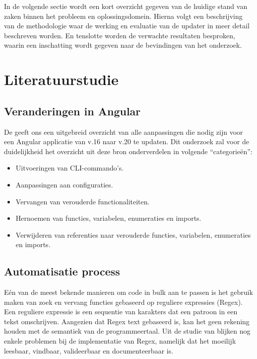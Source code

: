 In de volgende sectie wordt een kort overzicht gegeven van de huidige stand van zaken binnen het probleem en oplossingsdomein.
Hierna volgt een beschrijving van de methodologie waar de werking en evaluatie van de updater in meer detail beschreven worden.
En tenslotte worden de verwachte resultaten besproken, waarin een inschatting wordt gegeven naar de bevindingen van het onderzoek.

\section{Literatuurstudie}
\label{sec:literatuurstudie}

\subsection{Veranderingen in Angular}

De \textcite{AngularUpdateGuide} geeft ons een uitgebreid overzicht van alle aanpassingen die nodig zijn voor een Angular applicatie van v.16 naar v.20 te updaten. 
Dit onderzoek zal voor de duidelijkheid het overzicht uit deze bron onderverdelen in volgende ``categorieën'':

\begin{itemize}
  \item Uitvoeringen van CLI-commando's.
  \item Aanpassingen aan configuraties.
  \item Vervangen van verouderde functionaliteiten.
  \item Hernoemen van functies, variabelen, enumeraties en imports.
  \item Verwijderen van referenties naar verouderde functies, variabelen, enumeraties en imports.
\end{itemize}

\subsection{Automatisatie process}

Eén van de meest bekende manieren om code in bulk aan te passen is het gebruik maken van zoek en vervang functies gebaseerd op reguliere expressies (Regex).
Een reguliere expressie is een sequentie van karakters dat een patroon in een tekst omschrijven.
Aangezien dat Regex text gebaseerd is, kan het geen rekening houden met de semantiek van de programmeertaal.
Uit de studie van \textcite{Michael2019} blijken nog enkele problemen bij de implementatie van Regex, namelijk dat het moeilijk leesbaar, vindbaar, valideerbaar en documenteerbaar is.

